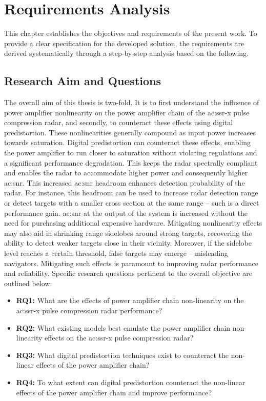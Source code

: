 %
\chapter{Requirements Analysis}\label{ch:requirements_analysis}

This chapter establishes the objectives and requirements of the present work. To provide a clear specification for the developed solution, the requirements are derived systematically through a step-by-step analysis based on the following.

\section{Research Aim and Questions}

The overall aim of this thesis is two-fold. It is to first understand the influence of power amplifier nonlinearity on the power amplifier chain of the \gls{ac:ssr-x} pulse compression radar, and secondly, to counteract these effects using digital predistortion. These nonlinearities generally compound as input power increases towards saturation. Digital predistortion can counteract these effects, enabling the power amplifier to run closer to saturation without violating regulations and a significant performance degradation. This keeps the radar spectrally compliant and enables the radar to accommodate higher power and consequently higher \gls{ac:snr}. This increased \gls{ac:snr} headroom enhances detection probability of the radar. For instance, this headroom can be used to increase radar detection range or detect targets with a smaller cross section at the same range – such is a direct performance gain. \gls{ac:snr} at the output of the system is increased without the need for purchasing additional expensive hardware. Mitigating nonlinearity effects may also aid in shrinking range sidelobes around strong targets, recovering the ability to detect weaker targets close in their vicinity. Moreover, if the sidelobe level reaches a certain threshold, false targets may emerge – misleading navigators. Mitigating such effects is paramount to improving radar performance and reliability. Specific research questions pertinent to the overall objective are outlined below:

\begin{itemize}
    \item \textbf{RQ1:} What are the effects of power amplifier chain non-linearity on the \gls{ac:ssr-x} pulse compression radar performance?
    \item \textbf{RQ2:} What existing models best emulate the power amplifier chain non-linearity effects on the \gls{ac:ssr-x} pulse compression radar?
    \item \textbf{RQ3:} What digital predistortion techniques exist to counteract the non-linear effects of the power amplifier chain?
    \item \textbf{RQ4:} To what extent can digital predistortion counteract the non-linear effects of the power amplifier chain and improve performance?
\end{itemize}

